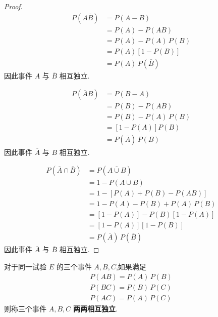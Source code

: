\begin{proof}
    \vspace{-1em}
    $$
    \begin{aligned}
        P(A \overline{B}) &= P(A-B) \\
        &= P(A) - P(AB) \\
        &= P(A) - P(A) \, P(B)\\
        &= P(A)[1-P(B)]\\
        &= P(A) \, P(\overline{B})
    \end{aligned}
    $$
    因此事件 $A$ 与 $\overline{B}$ 相互独立.

    $$
    \begin{aligned}
        P(\overline{A} B) &= P(B-A) \\
        &= P(B) - P(AB) \\
        &= P(B) - P(A) \, P(B) \\
        &= [1-P(A)] P(B) \\
        &= P(\overline{A}) \, P(B)
    \end{aligned}
    $$
    因此事件 $\overline{A}$ 与 $B$ 相互独立.

    $$
    \begin{aligned}
        P(\overline{A} \cap \overline{B}) &= P(\overline{A \cup B}) \\
        &= 1 - P(A \cup B) \\
        &= 1 - [P(A) + P(B) - P(AB)] \\
        &= 1 - P(A) - P(B) + P(A) \, P(B) \\
        &= [1-P(A)] - P(B) [1-P(A)] \\
        &= [1-P(A)][1-P(B)] \\
        &= P(\overline{A}) \, P(\overline{B})
    \end{aligned}
    $$
    因此事件 $\overline{A}$ 与 $\overline{B}$ 相互独立.
\end{proof}

\begin{definition}
    \indent 对于同一试验 $E$ 的三个事件 $A,B,C$,如果满足
    \begin{gather*}
        P(AB) = P(A) \, P(B) \\
        P(BC) = P(B) \, P(C) \\
        P(AC) = P(A) \, P(C)
    \end{gather*}
    则称三个事件 $A,B,C$ \textbf{两两相互独立}.
\end{definition}

